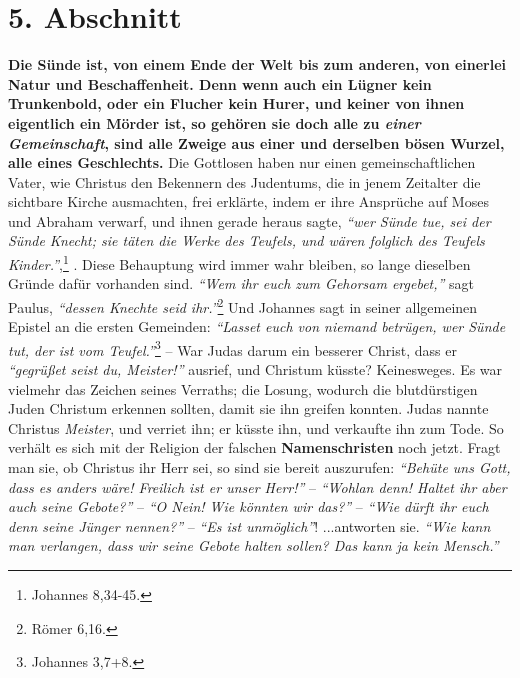 \section{5. Abschnitt} \label{kap1_ab5}

\label{ref:01_05_in_suende_gleich}
\textbf{Die Sünde
ist, von einem Ende der Welt bis zum anderen, von einerlei Natur und
Beschaffenheit. Denn wenn auch ein Lügner kein Trunkenbold, oder ein Flucher
kein Hurer, und keiner von ihnen eigentlich ein Mörder ist, so gehören sie doch
alle zu \textit{einer Gemeinschaft}, sind alle Zweige aus einer und derselben
bösen Wurzel, alle eines Geschlechts.} Die Gottlosen haben nur einen
gemeinschaftlichen Vater, wie Christus den Bekennern des Judentums, die in
jenem Zeitalter die sichtbare Kirche ausmachten, frei erklärte, indem er ihre
Ansprüche auf Moses und Abraham  
verwarf, und ihnen gerade heraus sagte,
\textit{"`wer Sünde tue, sei der Sünde Knecht; sie täten die Werke des Teufels,
und wären folglich des Teufels Kinder."'},\footnote{Johannes 8,34-45.}
.
Diese Behauptung wird immer wahr bleiben,
so lange dieselben Gründe dafür vorhanden sind.
\textit{"`Wem ihr euch zum Gehorsam ergebet,"'} sagt Paulus, \textit{"`dessen
Knechte seid ihr."'}\footnote{Römer 6,16.}
Und Johannes sagt in seiner allgemeinen Epistel an die ersten Gemeinden:
\textit{"`Lasset euch von niemand betrügen, wer Sünde tut, der ist vom Teufel."'}\footnote{Johannes 3,7+8.}
-- War Judas  darum ein besserer Christ, dass er
\textit{"`gegrüßet seist du, Meister!"'} ausrief, und Christum küsste?
Keinesweges. Es war vielmehr das Zeichen seines Verraths;
die Losung, wodurch die blutdürstigen Juden Christum erkennen sollten, damit sie
ihn greifen konnten. Judas nannte Christus \textit{Meister}, und verriet ihn;
er küsste ihn, und verkaufte ihn zum Tode.
So verhält es sich mit der Religion der falschen \textbf{Namenschristen}
 noch jetzt.
Fragt man sie, ob Christus ihr Herr sei,
so sind sie bereit auszurufen:
\textit{"`Behüte uns Gott, dass es anders wäre! Freilich ist er unser Herr!"'}
-- \textit{"`Wohlan denn! Haltet ihr aber auch seine Gebote?"'}
-- \textit{"`O Nein! Wie könnten wir das?"'}
-- \textit{"`Wie dürft ihr euch denn seine Jünger nennen?"'}
-- \textit{"`Es ist unmöglich"'}!
...antworten sie.
\textit{"`Wie kann man verlangen, dass wir seine Gebote halten sollen? Das kann
ja kein Mensch."'}
